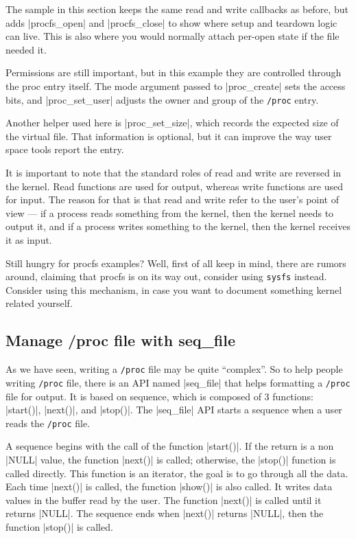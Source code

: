 \documentclass[10pt, oneside]{book}
\begin{document}
The sample in this section keeps the same read and write callbacks as before, but adds \cpp|procfs_open| and \cpp|procfs_close| to show where setup and teardown logic can live.
This is also where you would normally attach per-open state if the file needed it.

Permissions are still important, but in this example they are controlled through the proc entry itself.
The mode argument passed to \cpp|proc_create| sets the access bits, and \cpp|proc_set_user| adjusts the owner and group of the \verb|/proc| entry.

Another helper used here is \cpp|proc_set_size|, which records the expected size of the virtual file.
That information is optional, but it can improve the way user space tools report the entry.

It is important to note that the standard roles of read and write are reversed in the kernel.
Read functions are used for output, whereas write functions are used for input.
The reason for that is that read and write refer to the user's point of view --- if a process reads something from the kernel, then the kernel needs to output it, and if a process writes something to the kernel, then the kernel receives it as input.


Still hungry for procfs examples?
Well, first of all keep in mind, there are rumors around, claiming that procfs is on its way out, consider using \verb|sysfs| instead.
Consider using this mechanism, in case you want to document something kernel related yourself.

\subsection{Manage /proc file with seq\_file}
\label{sec:manage_procfs_with_seq_file}
As we have seen, writing a \verb|/proc| file may be quite ``complex''.
So to help people writing \verb|/proc| file, there is an API named \cpp|seq_file| that helps formatting a \verb|/proc| file for output.
It is based on sequence, which is composed of 3 functions: \cpp|start()|, \cpp|next()|, and \cpp|stop()|.
The \cpp|seq_file| API starts a sequence when a user reads the \verb|/proc| file.

A sequence begins with the call of the function \cpp|start()|.
If the return is a non \cpp|NULL| value, the function \cpp|next()| is called; otherwise, the \cpp|stop()| function is called directly.
This function is an iterator, the goal is to go through all the data.
Each time \cpp|next()| is called, the function \cpp|show()| is also called.
It writes data values in the buffer read by the user.
The function \cpp|next()| is called until it returns \cpp|NULL|.
The sequence ends when \cpp|next()| returns \cpp|NULL|, then the function \cpp|stop()| is called.
\end{document}
